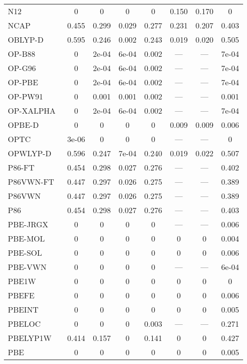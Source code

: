 \begin{table*}
\begin{tabular}{|l|c|c|c|c|c|c|c|}
N12~\cite{Peverati2012_2310} & 0 & 0 & 0 & 0 & 0.150 & 0.170 & 0 \\
NCAP~\cite{Carmona2019_303} & 0.455 & 0.299 & 0.029 & 0.277 & 0.231 & 0.207 & 0.403 \\
OBLYP-D~\cite{Goerigk2010_107} & 0.595 & 0.246 & 0.002 & 0.243 & 0.019 & 0.020 & 0.505 \\
OP-B88~\cite{Tsuneda1999_10664} & 0 & 2e-04 & 6e-04 & 0.002 & --- & --- & 7e-04 \\
OP-G96~\cite{Tsuneda1999_10664,Tsuneda1999_5656} & 0 & 2e-04 & 6e-04 & 0.002 & --- & --- & 7e-04 \\
OP-PBE~\cite{Tsuneda1999_10664,Tsuneda1999_5656} & 0 & 2e-04 & 6e-04 & 0.002 & --- & --- & 7e-04 \\
OP-PW91~\cite{Tsuneda1999_10664,Tsuneda1999_5656} & 0 & 0.001 & 0.001 & 0.002 & --- & --- & 0.001 \\
OP-XALPHA~\cite{Tsuneda1999_10664,Tsuneda1999_5656} & 0 & 2e-04 & 6e-04 & 0.002 & --- & --- & 7e-04 \\
OPBE-D~\cite{Goerigk2010_107} & 0 & 0 & 0 & 0 & 0.009 & 0.009 & 0.006 \\
OPTC~\cite{Cohen2001_607} & 3e-06 & 0 & 0 & 0 & --- & --- & 0 \\
OPWLYP-D~\cite{Goerigk2010_107} & 0.596 & 0.247 & 7e-04 & 0.240 & 0.019 & 0.022 & 0.507 \\
P86-FT~\cite{Perdew1986_8822} & 0.454 & 0.298 & 0.027 & 0.276 & --- & --- & 0.402 \\
P86VWN-FT~\cite{Perdew1986_8822} & 0.447 & 0.297 & 0.026 & 0.275 & --- & --- & 0.389 \\
P86VWN~\cite{Perdew1986_8822} & 0.447 & 0.297 & 0.026 & 0.275 & --- & --- & 0.389 \\
P86~\cite{Perdew1986_8822} & 0.454 & 0.298 & 0.027 & 0.276 & --- & --- & 0.403 \\
PBE-JRGX~\cite{Pedroza2009_201106} & 0 & 0 & 0 & 0 & --- & --- & 0.006 \\
PBE-MOL~\cite{delCampo2012_104108} & 0 & 0 & 0 & 0 & 0 & 0 & 0.004 \\
PBE-SOL~\cite{Perdew2008_136406} & 0 & 0 & 0 & 0 & 0 & 0 & 0.006 \\
PBE-VWN~\cite{Kraisler2010_042516,Perdew1996_3865,Perdew1997_1396} & 0 & 0 & 0 & 0 & --- & --- & 6e-04 \\
PBE1W~\cite{Dahlke2005_15677} & 0 & 0 & 0 & 0 & 0 & 0 & 0 \\
PBEFE~\cite{Perez2015_3844} & 0 & 0 & 0 & 0 & 0 & 0 & 0.006 \\
PBEINT~\cite{Fabiano2010_113104} & 0 & 0 & 0 & 0 & 0 & 0 & 0.005 \\
PBELOC~\cite{Constantin2012_035130} & 0 & 0 & 0 & 0.003 & --- & --- & 0.271 \\
PBELYP1W~\cite{Dahlke2005_15677} & 0.414 & 0.157 & 0 & 0.141 & 0 & 0 & 0.427 \\
PBE~\cite{Perdew1996_3865,Perdew1997_1396} & 0 & 0 & 0 & 0 & 0 & 0 & 0.005 \\
\bottomrule
\end{tabular}
\end{table*}

